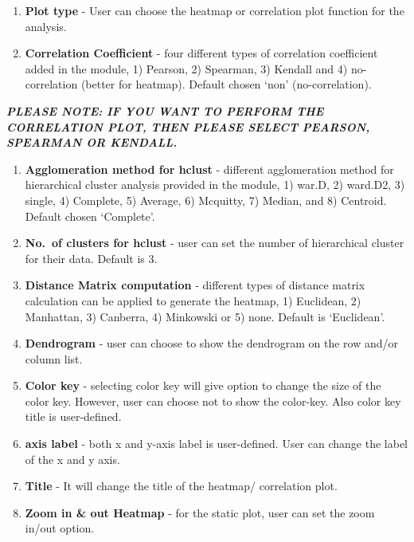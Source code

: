 \documentclass[
  a4paper,
  oneside,
  open=any]{scrreport}
\providecommand{\tightlist}{%
  \setlength{\itemsep}{0pt}\setlength{\parskip}{0pt}}\usepackage{longtable,booktabs,array}
\begin{document}
\begin{enumerate}
\def\labelenumi{\arabic{enumi}.}
\tightlist
\item
  \textbf{Plot type} - User can choose the heatmap or correlation plot
  function for the analysis.
\item
  \textbf{Correlation Coefficient} - four different types of correlation
  coefficient added in the module, 1) Pearson, 2) Spearman, 3) Kendall
  and 4) no-correlation (better for heatmap). Default chosen `non'
  (no-correlation).
\end{enumerate}

\begin{tcolorbox}[enhanced jigsaw, left=2mm, colback=white, breakable, leftrule=.75mm, coltitle=black, toprule=.15mm, rightrule=.15mm, colbacktitle=quarto-callout-important-color!10!white, title=\textcolor{quarto-callout-important-color}{\faExclamation}\hspace{0.5em}{Important}, opacitybacktitle=0.6, colframe=quarto-callout-important-color-frame, bottomrule=.15mm, bottomtitle=1mm, toptitle=1mm, titlerule=0mm, opacityback=0, arc=.35mm]
\textbf{\emph{PLEASE NOTE: IF YOU WANT TO PERFORM THE CORRELATION PLOT,
THEN PLEASE SELECT PEARSON, SPEARMAN OR KENDALL.}}
\end{tcolorbox}

\begin{enumerate}
\def\labelenumi{\arabic{enumi}.}
\setcounter{enumi}{2}
\tightlist
\item
  \textbf{Agglomeration method for hclust} - different agglomeration
  method for hierarchical cluster analysis provided in the module, 1)
  war.D, 2) ward.D2, 3) single, 4) Complete, 5) Average, 6) Mcquitty, 7)
  Median, and 8) Centroid. Default chosen `Complete'.
\item
  \textbf{No.~of clusters for hclust} - user can set the number of
  hierarchical cluster for their data. Default is 3.
\item
  \textbf{Distance Matrix computation} - different types of distance
  matrix calculation can be applied to generate the heatmap, 1)
  Euclidean, 2) Manhattan, 3) Canberra, 4) Minkowski or 5) none. Default
  is `Euclidean'.
\item
  \textbf{Dendrogram} - user can choose to show the dendrogram on the
  row and/or column list.
\item
  \textbf{Color key} - selecting color key will give option to change
  the size of the color key. However, user can choose not to show the
  color-key. Also color key title is user-defined.
\item
  \textbf{axis label} - both x and y-axis label is user-defined. User
  can change the label of the x and y axis.
\item
  \textbf{Title} - It will change the title of the heatmap/ correlation
  plot.
\item
  \textbf{Zoom in \& out Heatmap} - for the static plot, user can set
  the zoom in/out option.
\end{enumerate}
\end{document}
